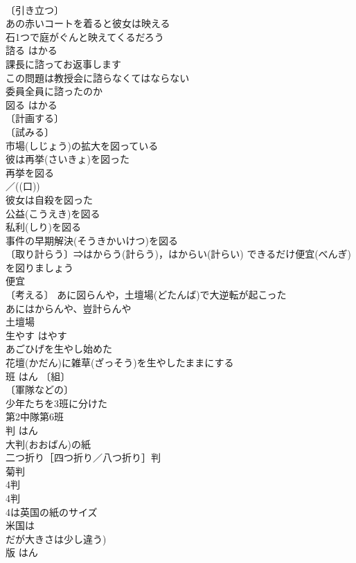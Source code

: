\documentclass[8pt]{extreport}
\begin{document}
\begin{CJK}{UTF8}{min}
\\	〔引き立つ〕
\\	あの赤いコートを着ると彼女は映える 
\\	石1つで庭がぐんと映えてくるだろう 
\\	諮る	はかる	
\\	課長に諮ってお返事します 
\\	この問題は教授会に諮らなくてはならない 
\\	委員全員に諮ったのか 
\\	図る	はかる	
\\	〔計画する〕
\\	〔試みる〕
\\	市場(しじょう)の拡大を図っている 
\\	彼は再挙(さいきょ)を図った 
\\	再挙を図る 
\\	／((口)) 
\\	彼女は自殺を図った 
\\	公益(こうえき)を図る 
\\	私利(しり)を図る 
\\	事件の早期解決(そうきかいけつ)を図る 
\\	〔取り計らう〕⇒はからう(計らう)，はからい(計らい) できるだけ便宜(べんぎ)を図りましょう 
\\	便宜　
\\	〔考える〕 あに図らんや，土壇場(どたんば)で大逆転が起こった 
\\	あにはからんや、豈計らんや　
\\	土壇場　
\\	生やす	はやす	
\\	あごひげを生やし始めた 
\\	花壇(かだん)に雑草(ざっそう)を生やしたままにする　
\\	班	はん	〔組〕
\\	〔軍隊などの〕
\\	少年たちを3班に分けた 
\\	第2中隊第6班 
\\	判	はん	
\\	大判(おおばん)の紙 
\\	二つ折り［四つ折り／八つ折り］判 
\\	菊判 
\\	4判 
\\	4判 
\\	4は英国の紙のサイズ
\\	米国は
\\	だが大きさは少し違う)
\\	版	はん	

\end{CJK}
\end{document}

